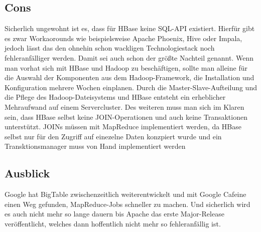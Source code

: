 \subsection{Cons}
Sicherlich ungewohnt ist es, dass für HBase keine SQL-API existiert. Hierfür gibt es zwar Workaorounds wie beispielsweise Apache Phoenix, Hive oder Impala, jedoch lässt das den ohnehin schon wackligen Technologiestack noch fehleranfälliger werden. 
Damit sei auch schon der größte Nachteil genannt. Wenn man vorhat sich mit HBase und Hadoop zu beschäftigen, sollte man alleine für die Auswahl der Komponenten aus dem Hadoop-Framework, die Installation und Konfiguration mehrere Wochen einplanen. Durch die Master-Slave-Aufteilung und die Pflege des Hadoop-Dateisystems und HBase entsteht ein erheblicher Mehraufwand auf einem Servercluster. Des weiteren muss man sich im Klaren sein, dass HBase selbst keine JOIN-Operationen und auch keine Transaktionen unterstützt. JOINs müssen mit MapReduce implementiert werden, da HBase selbst nur für den Zugriff auf einezelne Daten konzpiert wurde und ein Transktionsmanager muss von Hand implementiert werden

\subsection{Ausblick}
Google hat BigTable zwischenzeitlich weiterentwickelt und mit Google Cafeine einen Weg gefunden, MapReduce-Jobs schneller zu machen. Und sicherlich wird es auch nicht mehr so lange dauern bis Apache das erste Major-Release veröffentlicht, welches dann hoffentlich nicht mehr so fehleranfällig ist.
